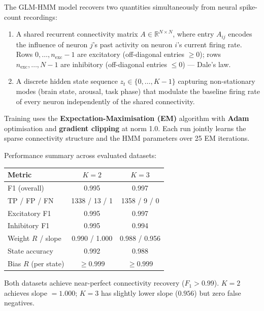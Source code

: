 \documentclass[11pt]{article}
\begin{document}
The GLM-HMM model recovers two quantities simultaneously from neural spike-count recordings:
\begin{enumerate}[leftmargin=*]
  \item A shared recurrent connectivity matrix $A\in\mathbb{R}^{N\times N}$, where entry
        $A_{ij}$ encodes the influence of neuron $j$'s past activity on neuron $i$'s
        current firing rate.  Rows $0,\ldots,n_{\mathrm{exc}}-1$ are excitatory
        (off-diagonal entries $\ge 0$); rows $n_{\mathrm{exc}},\ldots,N-1$ are
        inhibitory (off-diagonal entries $\le 0$) --- Dale's law.
  \item A discrete hidden state sequence $z_t\in\{0,\ldots,K-1\}$ capturing non-stationary
        modes (brain state, arousal, task phase) that modulate the baseline firing rate
        of every neuron independently of the shared connectivity.
\end{enumerate}

Training uses the \textbf{Expectation-Maximisation (EM)} algorithm with \textbf{Adam}
optimisation and \textbf{gradient clipping} at norm 1.0.  Each run jointly learns
the sparse connectivity structure and the HMM parameters over 25 EM iterations.

Performance summary across evaluated datasets:

\begin{center}
\begin{tabular}{lcc}
\toprule
Metric & $K=2$ & $K=3$ \\
\midrule
F1 (overall)         & 0.995 & 0.997 \\
TP / FP / FN         & 1338 / 13 / 1 & 1358 / 9 / 0 \\
Excitatory F1        & 0.995 & 0.997 \\
Inhibitory F1        & 0.995 & 0.994 \\
Weight $R$ / slope   & 0.990 / 1.000 & 0.988 / 0.956 \\
State accuracy       & 0.992 & 0.988 \\
Bias $R$ (per state) & $\ge 0.999$ & $\ge 0.999$ \\
\bottomrule
\end{tabular}
\end{center}

Both datasets achieve near-perfect connectivity recovery ($F_1 > 0.99$).
$K=2$ achieves slope $= 1.000$; $K=3$ has slightly lower slope ($0.956$) but zero
false negatives.

\end{document}
